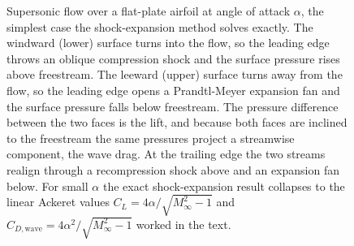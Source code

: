 \begin{figure}[htbp]
\centering
{}
\caption[Shock-expansion flow over a flat plate]{Supersonic flow over a
flat-plate airfoil at angle of attack $\alpha$, the simplest case the
shock-expansion method solves exactly. The windward (lower) surface
turns into the flow, so the leading edge throws an oblique compression
shock and the surface pressure rises above freestream. The leeward
(upper) surface turns away from the flow, so the leading edge opens a
Prandtl-Meyer expansion fan and the surface pressure falls below
freestream. The pressure difference between the two faces is the lift,
and because both faces are inclined to the freestream the same pressures
project a streamwise component, the wave drag. At the trailing edge the
two streams realign through a recompression shock above and an
expansion fan below. For small $\alpha$ the exact shock-expansion
result collapses to the linear Ackeret values
$C_L=4\alpha/\sqrt{M_\infty^2-1}$ and
$C_{D,\text{wave}}=4\alpha^2/\sqrt{M_\infty^2-1}$ worked in the text.}
\label{fig:vol03ch13:flat-plate-supersonic}
\end{figure}
